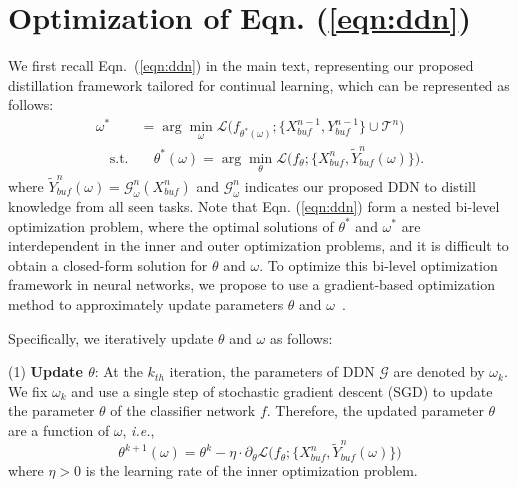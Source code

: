 \documentclass[table, xcdraw]{article}
\theoremstyle{plain}
\theoremstyle{definition}
\theoremstyle{remark}
\begin{document}




\newpage
\appendix
{}
\section{Optimization of Eqn. (\ref{eqn:ddn})}
We first recall Eqn.~(\ref{eqn:ddn}) in the main text, representing our proposed distillation framework tailored for continual learning, which can be represented as follows:
\begin{equation}
\begin{aligned} 
\omega^*  &= \arg\min_{\omega} \mathcal{L}\bigl(f_{\theta^*(\omega)};\{X_{buf}^{n-1},Y_{buf}^{n-1}\} \cup\mathcal{T}^n\bigr) \\
\quad  \text{s.t.} & \quad\theta^*(\omega) = \arg\min_{\theta} \mathcal{L}\bigl(f_\theta; \{X^n_{buf},\tilde{Y}^n_{buf}(\omega)\bigr\}).
\end{aligned}
\nonumber
\end{equation}
where $\tilde{Y}^n_{buf}(\omega)=\mathcal{G}^n_\omega(X^n_{buf})$ and $\mathcal{G}^n_\omega$ indicates our proposed DDN to distill knowledge from all seen tasks. Note that
Eqn. (\ref{eqn:ddn}) form a nested bi-level optimization problem,
where the optimal solutions of $\theta^*$ and $\omega^*$ are interdependent in the inner and outer optimization problems, and it is difficult to obtain a closed-form solution for $\theta$ and $\omega$. To optimize this bi-level optimization framework in neural networks, we propose to use a gradient-based optimization method to approximately update parameters $\theta$ and $\omega$~\cite{maml, wang2023cba}.

Specifically, we iteratively update $\theta$ and $\omega$ as follows:

(1) \textbf{Update $\theta$}: At the $k_{th}$ iteration, the parameters of DDN $\mathcal{G}$ are denoted by $\omega_k$. We fix $\omega_k$ and use a single step of stochastic gradient descent (SGD) to update the parameter $\theta$ of the classifier network $f$. 
Therefore, the updated parameter $\theta$ are a function of $\omega$, \textit{i.e.},
\begin{equation}
    \theta^{k+1}(\omega) = \theta^k - \eta \cdot \partial_{\theta}\mathcal{L}\bigl(f_\theta; \{X^n_{buf},\tilde{Y}^n_{buf}(\omega)\bigr\})
    \label{theta}
\end{equation}
where $\eta > 0$ is the learning rate of the inner optimization problem.
\end{document}
